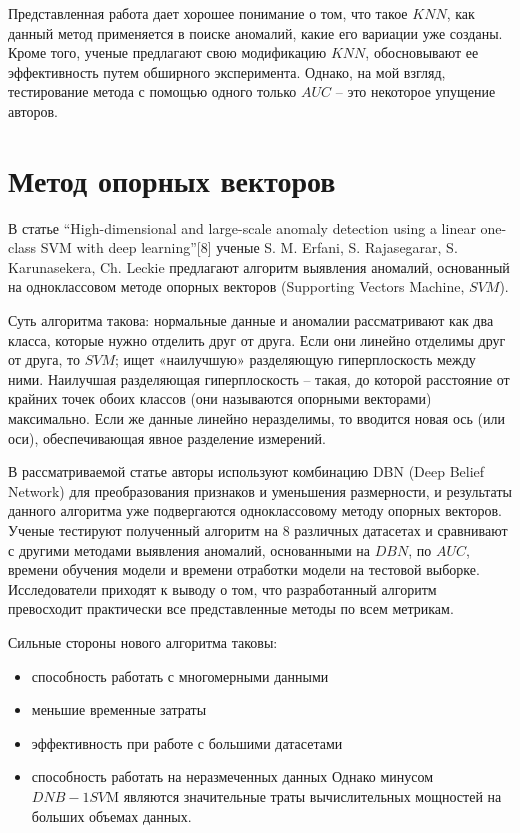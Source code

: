 \documentclass[14pt, letterpaper]{extarticle}
\begin{document}
Представленная работа дает хорошее понимание о том, что такое $KNN$, как данный метод применяется в поиске аномалий, какие его вариации уже созданы. Кроме того, ученые предлагают свою модификацию $KNN$, обосновывают ее эффективность путем обширного эксперимента. Однако, на мой взгляд, тестирование метода с помощью одного только $AUC$ – это некоторое упущение авторов.

\section{Метод опорных векторов}

 В статье “High-dimensional and large-scale anomaly detection using a linear one-class SVM with deep learning”[8] ученые S. M. Erfani, S. Rajasegarar, S. Karunasekera, Ch. Leckie \cite{erfani2016high} предлагают алгоритм выявления аномалий, основанный на одноклассовом  методе опорных векторов (Supporting Vectors Machine, $SVM$).
 
 Суть алгоритма такова: нормальные данные и аномалии рассматривают как два класса, которые нужно отделить друг от друга. Если они линейно отделимы друг от друга, то $SVM$; ищет «наилучшую» разделяющую гиперплоскость между ними. Наилучшая разделяющая гиперплоскость – такая, до которой расстояние от крайних точек обоих классов (они называются опорными векторами) максимально. Если же данные линейно неразделимы, то вводится новая ось (или оси), обеспечивающая явное разделение измерений.

В рассматриваемой статье авторы используют комбинацию DBN (Deep Belief Network) для преобразования признаков и уменьшения размерности, и результаты данного алгоритма уже подвергаются одноклассовому методу опорных векторов. Ученые тестируют полученный алгоритм на 8 различных датасетах и сравнивают с другими методами выявления аномалий, основанными на $DBN$, по $AUC$, времени обучения модели и времени отработки модели на тестовой выборке. Исследователи приходят к выводу о том, что разработанный алгоритм превосходит практически все представленные методы по всем метрикам. 

Сильные стороны нового алгоритма таковы:
\begin{itemize}
    \item способность работать с многомерными данными
    \item меньшие временные затраты
    \item эффективность при работе с большими датасетами
    \item способность работать на неразмеченных данных
Однако минусом $DNB-1SV$M являются значительные траты вычислительных мощностей на больших объемах данных.
\end{itemize}
\end{document}
